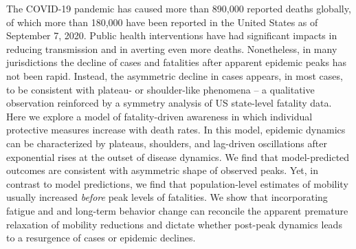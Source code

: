 The COVID-19 pandemic has caused more than 890,000 reported deaths
globally, of which more than 180,000 have been reported
in the United States as of September 7, 2020. Public health interventions
have had significant impacts in reducing transmission and in
averting even more deaths. Nonetheless, in many jurisdictions
the decline of cases and fatalities
after apparent epidemic peaks has not been rapid.  Instead, the asymmetric
decline in cases appears, in most cases, to be consistent
with plateau- or shoulder-like phenomena -- a qualitative
observation reinforced by a symmetry analysis
of US state-level fatality data.  Here we explore a model of fatality-driven
awareness in which individual protective measures increase
with death rates.  In this model, epidemic dynamics
can be characterized by plateaus, shoulders,
and lag-driven oscillations after exponential rises
at the outset of disease dynamics. 
We find that model-predicted outcomes
are consistent with asymmetric shape of observed peaks. 
Yet, in contrast
to model predictions, we find that population-level
estimates of mobility usually increased \emph{before} 
peak levels of fatalities.  We show that
incorporating fatigue and
and long-term behavior change can reconcile the apparent
premature relaxation of mobility reductions and dictate whether
post-peak dynamics leads to a resurgence of cases or epidemic declines.
